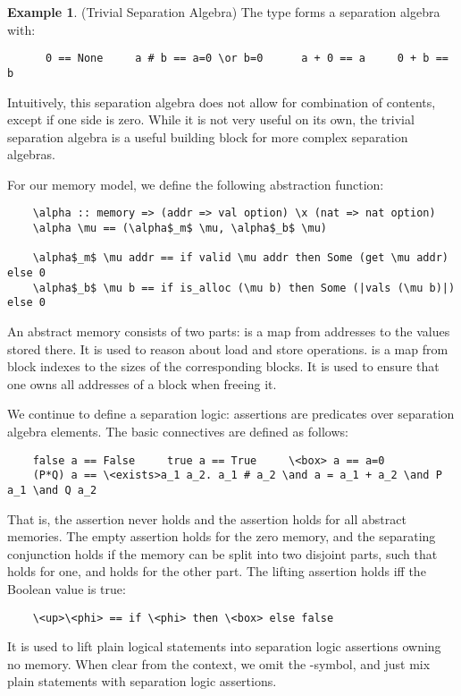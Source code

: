 \documentclass[sn-mathphys,Numbered]{sn-jnl}
\theoremstyle{thmstyleone}%
\theoremstyle{definition}%
\newtheorem{example}{Example}%
\theoremstyle{thmstylethree}%
\begin{document}
  \begin{example}(Trivial Separation Algebra)
    The type  forms a separation algebra with:
    \begin{lstlisting}
      0 == None     a # b == a=0 \or b=0      a + 0 == a     0 + b == b
    \end{lstlisting}
    Intuitively, this separation algebra does not allow for combination of contents, except if one side is zero.
    While it is not very useful on its own, the trivial separation algebra is a useful building block for
    more complex separation algebras.
  \end{example}

  For our memory model, we define the following abstraction function:
  \begin{lstlisting}
    \alpha :: memory => (addr => val option) \x (nat => nat option)
    \alpha \mu == (\alpha$_m$ \mu, \alpha$_b$ \mu)

    \alpha$_m$ \mu addr == if valid \mu addr then Some (get \mu addr) else 0
    \alpha$_b$ \mu b == if is_alloc (\mu b) then Some (|vals (\mu b)|) else 0
  \end{lstlisting}
  An abstract memory \is{\alpha \mu} consists of two parts:
   is a map from addresses to the values stored there. It is used to reason about load and store operations.
   is a map from block indexes to the sizes of the corresponding blocks.
    It is used to ensure that one owns all addresses of a block when freeing it.

  We continue to define a separation logic: assertions are predicates over separation algebra elements.
  The basic connectives are defined as follows:
  \begin{lstlisting}
    false a == False     true a == True     \<box> a == a=0
    (P*Q) a == \<exists>a_1 a_2. a_1 # a_2 \and a = a_1 + a_2 \and P a_1 \and Q a_2
  \end{lstlisting}
  That is, the assertion  never holds and the assertion  holds for all abstract memories.
  The empty assertion  holds for the zero memory, and the separating conjunction 
  holds if the memory can be split into two disjoint parts, such that  holds for one,
  and  holds for the other part. The lifting assertion  holds iff the Boolean value  is true:
  \begin{lstlisting}
    \<up>\<phi> == if \<phi> then \<box> else false
  \end{lstlisting}
  It is used to lift plain logical statements into separation logic assertions owning no memory.
  When clear from the context, we omit the -symbol, and just mix plain statements with separation logic assertions.
\end{document}
